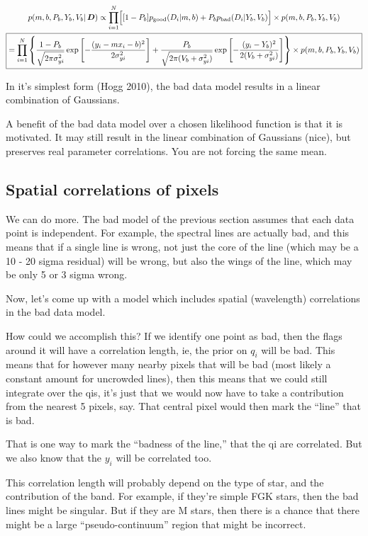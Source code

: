 \documentclass[preprint]{aastex} %
\begin{document}
\begin{multline}
  p(m,b,P_b,Y_b,V_b|\,{\bm D}) \propto \prod_{i=1}^N \Bigl [ [1 - P_b] p_{\rm good}(D_i | m, b)  + P_b p_{\rm bad}(D_i | Y_b, V_b)\Bigr ] \times p(m,b,P_b, Y_b, V_b)\\
  \boxed{
    = \prod_{i=1}^N \left\{ \frac{1 - P_b}{\sqrt{2 \pi \sigma_{yi}^2}} \exp \left[ - \frac{(y_i - m x_i - b)^2}{2 \sigma_{yi}^2} \right] + \frac{P_b}{\sqrt{2 \pi (V_b + \sigma_{yi}^2)}} \exp \left[- \frac{(y_i - Y_b)^2}{2 (V_b + \sigma_{yi}^2)} \right] \right\}
  \times p(m,b,P_b,Y_b,V_b)}
\end{multline}

In it's simplest form (Hogg 2010), the bad data model results in a linear combination of Gaussians. 

A benefit of the bad data model over a chosen likelihood function is that it is motivated. It may still result in the linear combination of Gaussians (nice), but preserves real parameter correlations. You are not forcing the same mean.


\subsection{Spatial correlations of pixels}
We can do more. The bad model of the previous section assumes that each data point is independent. For example, the spectral lines are actually bad, and this means that if a single line is wrong, not just the core of the line (which may be a 10 - 20 sigma residual) will be wrong, but also the wings of the line, which may be only 5 or 3 sigma wrong.

Now, let's come up with a model which includes spatial (wavelength) correlations in the bad data model.

How could we accomplish this? If we identify one point as bad, then the flags around it will have a correlation length, ie, the prior on $q_i$ will be bad. This means that for however many nearby pixels that will be bad (most likely a constant amount for uncrowded lines), then this means that we could still integrate over the qis, it's just that we would now have to take a contribution from the nearest 5 pixels, say. That central pixel would then mark the ``line'' that is bad. 

That is one way to mark the ``badness of the line,'' that the qi are correlated. But we also know that the $y_i$ will be correlated too. 

This correlation length will probably depend on the type of star, and the contribution of the band. For example, if they're simple FGK stars, then the bad lines might be singular. But if they are M stars, then there is a chance that there might be a large ``pseudo-continuum'' region that might be incorrect.
\end{document}
